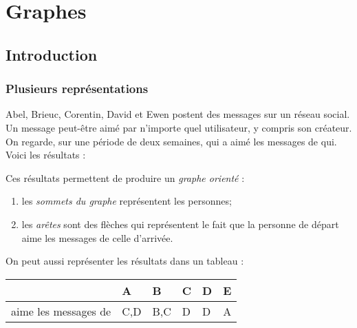 \documentclass[a4paper,12pt]{book}
\begin{document}

\chapter{Graphes}

\section{Introduction}
\subsection*{Plusieurs représentations}

Abel, Brieuc, Corentin, David et Ewen postent des messages sur un réseau social. Un message peut-être \og aimé\fg{} par n'importe quel utilisateur, y compris son créateur.\\
On regarde, sur une période de deux semaines, qui a aimé les messages de qui. Voici les résultats : 


Ces résultats permettent de produire un \textit{graphe orienté} :
\begin{enumerate}[--]
	\item 	les \textit{sommets du graphe} représentent les personnes;
	\item 	les \textit{arêtes} sont des flèches qui représentent le fait que la personne de départ aime les messages de celle d'arrivée.
\end{enumerate}



On peut aussi représenter les résultats dans un tableau :

\begin{center}
\begin{tabular}{|l|>{\centering\arraybackslash}p{.5cm}|>{\centering\arraybackslash}p{.5cm}|>{\centering\arraybackslash}p{.5cm}|>{\centering\arraybackslash}p{.5cm}|>{\centering\arraybackslash}p{.5cm}|}
\hline
 & A & B & C & D & E \\
\hline
aime les messages de  & C,D & B,C & D & D & A \\
\hline
\end{tabular}
\end{center}
\end{document}
